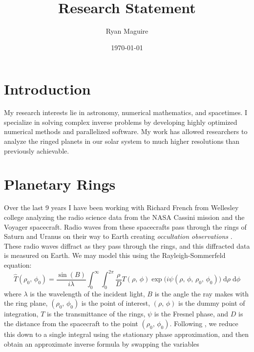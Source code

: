 \documentclass{article}
\title{Research Statement}
\author{Ryan Maguire}
\date{\today}
\begin{document}
    \maketitle
    \section{Introduction}
        My research interests lie in astronomy, numerical mathematics,
        and spacetimes.
        I specialize in solving complex inverse problems by developing
        highly optimized numerical methods and parallelized software.
        My work has allowed researchers to analyze the ringed planets in our
        solar system to much higher resolutions than previously achievable.
    \section{Planetary Rings}
        Over the last 9 years I have been working with Richard French from
        Wellesley college analyzing the radio science data from the NASA
        Cassini mission and the Voyager spacecraft. Radio waves from these
        spacecrafts pass through the rings of Saturn and Uranus on their way
        to Earth creating \textit{occultation observations}
        \cite{Marouf1982TheoryOR}. These radio waves diffract as they pass
        through the rings, and this diffracted data is measured on Earth. We
        may model this using the Rayleigh-Sommerfeld equation:
        \begin{equation}
            \hat{T}(\rho_{0},\,\phi_{0})
            =
            \frac{\sin(B)}{i\lambda}
            \int_{0}^{\infty}
                \int_{0}^{2\pi}
                    \frac{\rho}{D}
                    T(\rho,\,\phi)
                    \exp\big(i\psi(\rho,\,\phi,\,\rho_{0},\,\phi_{0})\big)\;
                \textrm{d}\rho\;
                \textrm{d}\phi
        \end{equation}
        where $\lambda$ is the wavelength of the incident light, $B$ is
        the angle the ray makes with the ring plane, $(\rho_{0},\,\phi_{0})$
        is the point of interest, $(\rho,\,\phi)$ is the dummy point of
        integration, $T$ is the transmittance of the rings, $\psi$ is
        the Fresnel phase, and $D$ is the distance from the spacecraft to
        the point $(\rho_{0},\,\phi_{0})$. Following \cite{MTR86}, we reduce
        this down to a single integral using the stationary phase approximation,
        and then obtain an approximate inverse formula by swapping the variables
\end{document}
